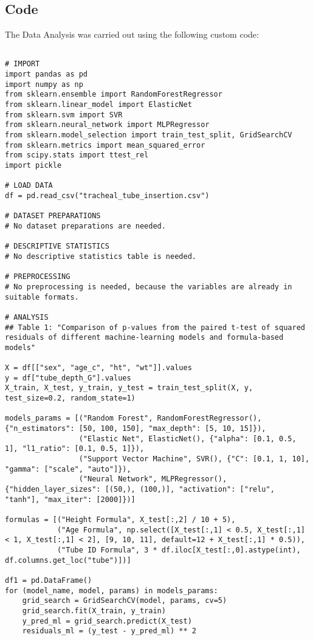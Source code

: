 \documentclass[11pt]{article}
\begin{document}
\subsection{{Code}}
The Data Analysis was carried out using the following custom code:

\begin{verbatim}

# IMPORT
import pandas as pd
import numpy as np
from sklearn.ensemble import RandomForestRegressor
from sklearn.linear_model import ElasticNet
from sklearn.svm import SVR
from sklearn.neural_network import MLPRegressor
from sklearn.model_selection import train_test_split, GridSearchCV
from sklearn.metrics import mean_squared_error
from scipy.stats import ttest_rel
import pickle

# LOAD DATA
df = pd.read_csv("tracheal_tube_insertion.csv")

# DATASET PREPARATIONS
# No dataset preparations are needed.

# DESCRIPTIVE STATISTICS
# No descriptive statistics table is needed.

# PREPROCESSING 
# No preprocessing is needed, because the variables are already in suitable formats.

# ANALYSIS
## Table 1: "Comparison of p-values from the paired t-test of squared residuals of different machine-learning models and formula-based models"

X = df[["sex", "age_c", "ht", "wt"]].values
y = df["tube_depth_G"].values
X_train, X_test, y_train, y_test = train_test_split(X, y, test_size=0.2, random_state=1)

models_params = [("Random Forest", RandomForestRegressor(), {"n_estimators": [50, 100, 150], "max_depth": [5, 10, 15]}),
                 ("Elastic Net", ElasticNet(), {"alpha": [0.1, 0.5, 1], "l1_ratio": [0.1, 0.5, 1]}),
                 ("Support Vector Machine", SVR(), {"C": [0.1, 1, 10], "gamma": ["scale", "auto"]}),
                 ("Neural Network", MLPRegressor(), {"hidden_layer_sizes": [(50,), (100,)], "activation": ["relu", "tanh"], "max_iter": [2000]})]

formulas = [("Height Formula", X_test[:,2] / 10 + 5),
            ("Age Formula", np.select([X_test[:,1] < 0.5, X_test[:,1] < 1, X_test[:,1] < 2], [9, 10, 11], default=12 + X_test[:,1] * 0.5)),
            ("Tube ID Formula", 3 * df.iloc[X_test[:,0].astype(int), df.columns.get_loc("tube")])]

df1 = pd.DataFrame()
for (model_name, model, params) in models_params:
    grid_search = GridSearchCV(model, params, cv=5)
    grid_search.fit(X_train, y_train)
    y_pred_ml = grid_search.predict(X_test)
    residuals_ml = (y_test - y_pred_ml) ** 2


\end{verbatim}
\end{document}
